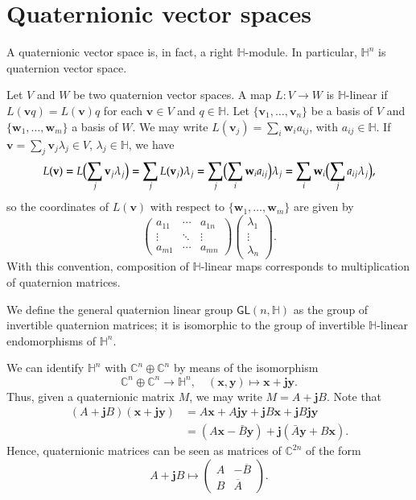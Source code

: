 \documentclass[12pt, a4paper,draft]{amsart}
\newcommand{\C}{\mathbb{C}}
\renewcommand{\H}{\mathbb{H}}
\theoremstyle{remark}
\begin{document}
\section{Quaternionic vector spaces}\label{sec:vector-spaces}

A quaternionic vector space is, in fact, a right $\H$-module.
In particular, $\H^n$ is quaternion vector space.

Let $V$ and $W$ be two quaternion vector spaces. 
A map $L\colon V\to W$ is $\H$-linear if $L(\mathbf{v}q)=L(\mathbf{v})q$ for each $\mathbf{v}\in V$ and $q\in\H$. Let $\{\mathbf{v}_1,\dots,\mathbf{v}_n\}$ be a basis of $V$ and $\{\mathbf{w}_1,\dots,\mathbf{w}_m\}$ a basis of $W$. 
We may write $L(\mathbf{v}_j)=\sum_i \mathbf{w}_i a_{ij}$, with $a_{ij}\in\H$. 
If $\mathbf{v}=\sum_j \mathbf{v}_j\lambda_j\in V$, $\lambda_j\in\H$, we have 
\[
L(\mathbf{v})
=L\Bigl(\sum_j \mathbf{v}_j\lambda_j\Bigr)
=\sum_j L(\mathbf{v}_j)\lambda_j{}=\sum_j\Bigl(\sum_i \mathbf{w}_i a_{ij}\Bigr)\lambda_j
=\sum_{i}\mathbf{w}_i\Bigl(\sum_j a_{ij}\lambda_j\Bigr),
\]
so the coordinates of $L(\mathbf{v})$ with respect to $\{\mathbf{w}_1,\dots,\mathbf{w}_m\}$ are given by
\[
\begin{pmatrix}
a_{11} & \cdots & a_{1n}\\
\vdots & \ddots & \vdots\\
a_{m1} & \cdots & a_{mn}
\end{pmatrix}
\begin{pmatrix}
\lambda_1\\
\vdots\\
\lambda_n
\end{pmatrix}.
\]
With this convention, composition of $\H$-linear maps corresponds to multiplication of quaternion matrices.

We define the general quaternion linear group $\mathsf{GL}(n,\H)$ as the group of invertible quaternion matrices; it is isomorphic to the group of invertible $\H$-linear endomorphisms of $\H^n$. 

We can identify $\H^n$ with $\C^n\oplus\C^n$ by means of the isomorphism
\[
\C^n\oplus\C^n\to\H^n,\quad (\mathbf{x},\mathbf{y})\mapsto \mathbf{x}+\mathbf{j}\mathbf{y}.
\]
Thus, given a quaternionic matrix $M$, we may write $M=A+\mathbf{j}B$.
Note that
\[
\begin{aligned}
(A+\mathbf{j}B)(\mathbf{x}+\mathbf{j}\mathbf{y})
&{}=A\mathbf{x}+A\mathbf{j}\mathbf{y}
+\mathbf{j}B\mathbf{x}+\mathbf{j}B\mathbf{j}\mathbf{y}\\
&{}=(A\mathbf{x}-\bar{B}\mathbf{y})
+\mathbf{j}(\bar{A}\mathbf{y}+B\mathbf{x}).
\end{aligned}
\]
Hence, quaternionic matrices can be seen as matrices of $\C^{2n}$ of the form
\[
A+\mathbf{j}B\mapsto
\begin{pmatrix}
A & -\overline{B}\\
B & \overline{A}
\end{pmatrix}.
\]
\end{document}
